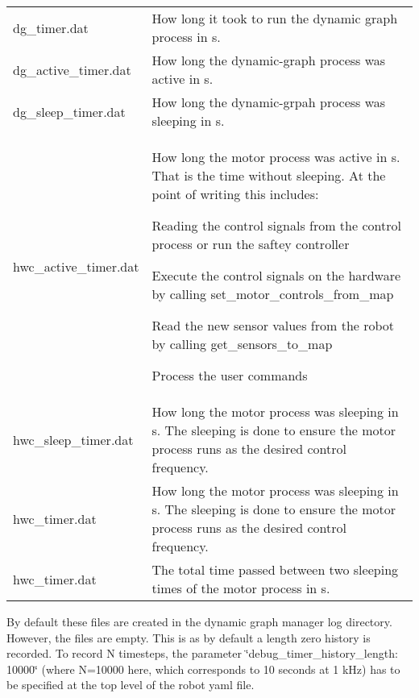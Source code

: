 \hypertarget{subsubpage_stl_simplify_cad}{}
\tabulinesep=1mm
\begin{longtabu} spread 0pt [c]{*{2}{|X[-1]}|}
\caption{}\label{subsubpage_stl_simplify_cad}\\
\hline
dg\+\_\+timer.\+dat &How long it took to run the dynamic graph process in s. \\
dg\+\_\+active\+\_\+timer.\+dat &How long the dynamic-\/graph process was active in s. \\
dg\+\_\+sleep\+\_\+timer.\+dat &How long the dynamic-\/grpah process was sleeping in s. \\
hwc\+\_\+active\+\_\+timer.\+dat &How long the motor process was active in s. That is the time without sleeping. At the point of writing this includes\+:
\begin{DoxyItemize}
\item Reading the control signals from the control process or run the saftey controller
\item Execute the control signals on the hardware by calling set\+\_\+motor\+\_\+controls\+\_\+from\+\_\+map
\item Read the new sensor values from the robot by calling get\+\_\+sensors\+\_\+to\+\_\+map
\item Process the user commands 
\end{DoxyItemize}\\
hwc\+\_\+sleep\+\_\+timer.\+dat &How long the motor process was sleeping in s. The sleeping is done to ensure the motor process runs as the desired control frequency. \\
hwc\+\_\+timer.\+dat &How long the motor process was sleeping in s. The sleeping is done to ensure the motor process runs as the desired control frequency. \\
hwc\+\_\+timer.\+dat &The total time passed between two sleeping times of the motor process in s. \\
\end{longtabu}


By default these files are created in the dynamic graph manager log directory. However, the files are empty. This is as by default a length zero history is recorded. To record N timesteps, the parameter \char`\"{}debug\+\_\+timer\+\_\+history\+\_\+length\+: 10000\char`\"{} (where N=10000 here, which corresponds to 10 seconds at 1 k\+Hz) has to be specified at the top level of the robot yaml file. 